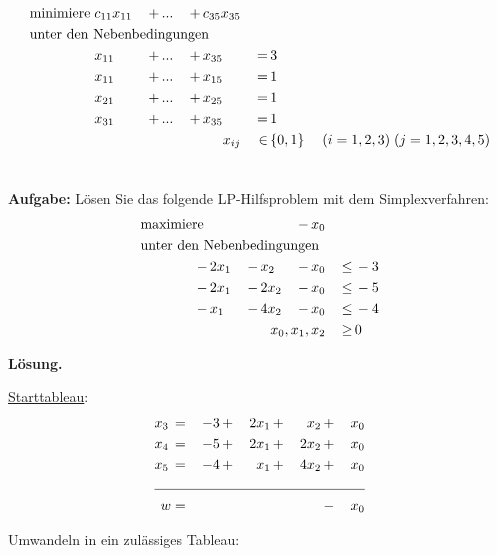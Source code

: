 \documentclass[10pt,a4paper,oneside,ngerman,numbers=noenddot]{scrartcl}
\begin{document}
	\subsection{} %
		\begin{alignat*}{5}
			\text{minimiere}\; & c_{11}x_{11} \,&+&\, ... \,&+&\, c_{35}x_{35} \,&& && \\
			\multicolumn{10}{l}{\text{unter den Nebenbedingungen}} \\
			\; & x_{11} \,&+&\, ... \,&+&\, x_{35} \,&=&\, 3 && \\
			\; & x_{11} \,&+&\, ... \,&+&\, x_{15} \,&=&\, 1 && \\
			\; & x_{21} \,&+&\, ... \,&+&\, x_{25} \,&=&\, 1 && \\
			\; & x_{31} \,&+&\, ... \,&+&\, x_{35} \,&=&\, 1 && \\
			\multicolumn{6}{r}{$x_{ij}$} \,&\in &\, \{0,1\} &\;  (i = 1, 2, 3) &\; (j = 1, 2, 3, 4, 5)
		\end{alignat*}
\section{} %
		\textbf{Aufgabe:} Lösen Sie das folgende LP-Hilfsproblem mit dem Simplexverfahren:
		\begin{alignat*}{4}
			\text{maximiere}\; & && &-&\, x_{0} \,&& \\
			\multicolumn{8}{l}{\text{unter den Nebenbedingungen}} \\
			\;-&\, 2x_{1} \,&-&\, x_{2} \,&-&\, x_{0} \,&\leq &\, -3 \\
			\;-&\, 2x_{1} \,&-&\, 2x_{2} \,&-&\, x_{0} \,&\leq &\, -5 \\
			\;-&\, x_{1} \,&-&\, 4x_{2} \,&-&\, x_{0} \,&\leq &\, -4 \\
			\multicolumn{6}{r}{$x_{0}, x_{1}, x_{2}$} \,&\geq &\, 0
		\end{alignat*}
		
		\textbf{Lösung.}
		
		\underline{Starttableau}:
		\begin{alignat*}{5}
			x_{3} \,&=&\, -3 \,&+&\, 2x_{1} \,&+&\, x_{2} \,&+&\, x_{0} \\
			x_{4} \,&=&\, -5 \,&+&\, 2x_{1} \,&+&\, 2x_{2} \,&+&\, x_{0} \\
			x_{5} \,&=&\, -4 \,&+&\, x_{1} \,&+&\, 4x_{2} \,&+&\, x_{0} \\ \cline{1 - 9}
			w &=& && && \,&-&\, x_{0}
		\end{alignat*}
		
		Umwandeln in ein zulässiges Tableau:
				
\end{document}
